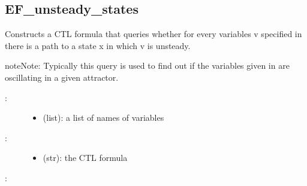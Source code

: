 \documentclass[letterpaper,10pt,english]{sphinxmanual}
\begin{document}
\subsection{EF\_unsteady\_states}
\label{\detokenize{QueryPatterns:ef-unsteady-states}}

\begin{fulllineitems}
\label{\detokenize{QueryPatterns:PyBoolNet.QueryPatterns.EF_unsteady_states}}
Constructs a CTL formula that queries whether for every variables v specified in  there is a path to a state x in which v is unsteady.

\begin{sphinxadmonition}{note}{Note:}
Typically this query is used to find out if the variables given in  are oscillating in a given attractor.
\end{sphinxadmonition}
\begin{description}
\item[{:}] \leavevmode\begin{itemize}
\item {} 
 (list): a list of names of variables

\end{itemize}

\item[{:}] \leavevmode\begin{itemize}
\item {} 
 (str): the CTL formula

\end{itemize}

\end{description}

:

\begin{sphinxVerbatim}[commandchars=\\\{\}]
  \PYG{p}{[}\PYG{p}{]}
\end{sphinxVerbatim}

\end{fulllineitems}
\end{document}
